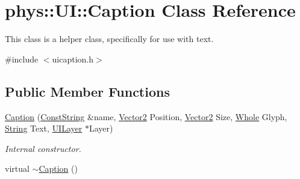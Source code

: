 \hypertarget{classphys_1_1UI_1_1Caption}{
\section{phys::UI::Caption Class Reference}
\label{d4/dfe/classphys_1_1UI_1_1Caption}
}


This class is a helper class, specifically for use with text.  




{\ttfamily \#include $<$uicaption.h$>$}

\subsection*{Public Member Functions}
\begin{DoxyCompactItemize}
\item 
\hyperlink{classphys_1_1UI_1_1Caption_a3ee10015d5f17448a1f1825f73d4ac08}{Caption} (\hyperlink{namespacephys_a5ce5049f8b4bf88d6413c47b504ebb31}{ConstString} \&name, \hyperlink{classphys_1_1Vector2}{Vector2} Position, \hyperlink{classphys_1_1Vector2}{Vector2} Size, \hyperlink{namespacephys_a460f6bc24c8dd347b05e0366ae34f34a}{Whole} Glyph, \hyperlink{namespacephys_aa03900411993de7fbfec4789bc1d392e}{String} Text, \hyperlink{classphys_1_1UILayer}{UILayer} $\ast$Layer)
\begin{DoxyCompactList}\small\item\em Internal constructor. \item\end{DoxyCompactList}\item 
\hypertarget{classphys_1_1UI_1_1Caption_a5443ce0c7c7dc4b4f1c56b124e092a98}{
virtual \hyperlink{classphys_1_1UI_1_1Caption_a5443ce0c7c7dc4b4f1c56b124e092a98}{$\sim$Caption} ()}
\label{d4/dfe/classphys_1_1UI_1_1Caption_a5443ce0c7c7dc4b4f1c56b124e092a98}


\end{DoxyCompactItemize}
